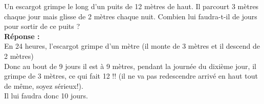 Un escargot grimpe le long d'un puits de 12 mètres de haut. Il parcourt 3 mètres chaque 
jour mais glisse de 2 mètres chaque nuit. Combien lui faudra-t-il de jours pour sortir 
de ce puits ?\\

\textbf{Réponse :}\\

En 24 heures, l'escargot grimpe d'un mètre (il monte de 3 mètres et il descend de 2 
mètres)\\

Donc au bout de 9 jours il est à 9 mètres, pendant la journée du dixième jour,
il grimpe de 3 mètres, ce qui fait 12 !! (il ne va pas redescendre arrivé en haut 
tout de même, soyez sérieux!).\\

Il lui faudra donc 10 jours.